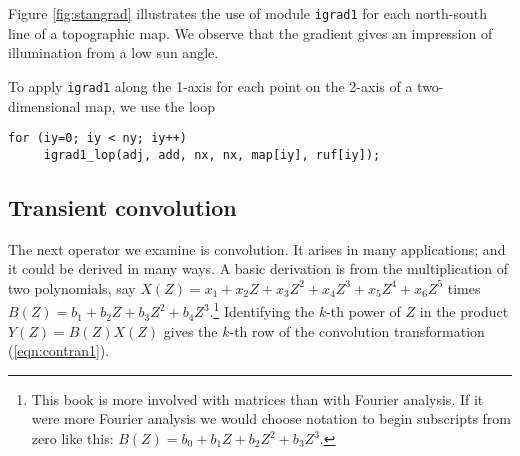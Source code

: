 
\par
Figure \ref{fig:stangrad} illustrates the use of module
\texttt{igrad1} for each north-south line of a topographic map.  We
observe that the gradient gives an impression of illumination from a
low sun angle.


To apply \texttt{igrad1} along the 1-axis for each point on the 2-axis
of a two-dimensional map, we use the loop
\begin{verbatim}
for (iy=0; iy < ny; iy++) 
     igrad1_lop(adj, add, nx, nx, map[iy], ruf[iy]);
\end{verbatim}
\begin{comment}
On the other hand, to see the east-west gradient, we use the loop
\begin{verbatim}
do ix=1,nx 
      stat = igrad1_lop( adj, add, map(ix,:), ruf(ix,:))
\end{verbatim}
\end{comment}



\subsection{Transient convolution}

\par
The next operator we examine is convolution.
It arises in many applications; and it could be derived in many ways.
A basic derivation is from the multiplication of two polynomials, say
$X(Z) = x_1 + x_2 Z + x_3 Z^2 + x_4 Z^3 + x_5 Z^4 + x_6 Z^5$ times
$B(Z) = b_1 + b_2 Z + b_3 Z^2 + b_4 Z^3$.\footnote{
	This book is more involved with matrices than with Fourier analysis.
	If it were more Fourier analysis we would choose notation
	to begin subscripts from zero like this:
	$B(Z) = b_0 + b_1 Z + b_2 Z^2 + b_3 Z^3$.}
Identifying the $k$-th power of $Z$ in the product
$Y(Z)=B(Z)X(Z)$ gives the $k$-th row of the convolution transformation
(\ref{eqn:contran1}).

